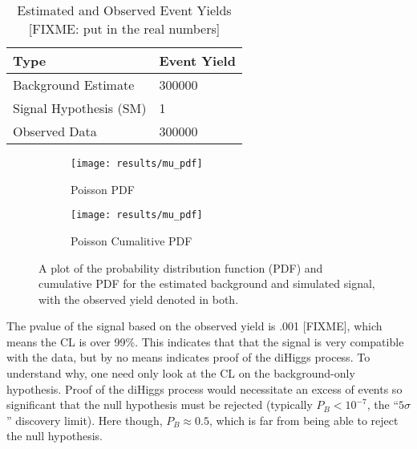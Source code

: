     \begin{table}[tbh]
       \begin{center}
           \caption{Estimated and Observed Event Yields [FIXME: put in the real numbers]}
           \label{tab:event_yield}
           \footnotesize
           \begin{tabular}{|l|l|}
           \toprule
               Type  &	Event Yield \\
               \midrule
               Background Estimate  & 300000 \\
               Signal Hypothesis (SM) & 1 \\
               Observed Data & 300000 \\
           \bottomrule
           \end{tabular}
       \end{center}
    \end{table}

    \begin{figure} %
        \centering
        \begin{subfigure}{0.48\textwidth} 
            \texttt{[image: results/mu\_pdf]}
            \caption{Poisson PDF}
            \label{fig:poisson_sig:pdf}
        \end{subfigure}
        \begin{subfigure}{0.48\textwidth}
            \texttt{[image: results/mu\_pdf]}
            \caption{Poisson Cumalitive PDF}
            \label{fig:poisson_sig:Cpdf}
        \end{subfigure}
        \caption{
            A plot of the probability distribution function (PDF)
                and cumulative PDF for the estimated background and simulated signal,
                with the observed yield denoted in both.
        }
    \end{figure}

    The pvalue of the signal based on the observed yield is .001 [FIXME],
        which means the CL is over 99\%.
    This indicates that that the signal is very compatible with the data,
        but by no means indicates proof of the diHiggs process.
    To understand why, one need only look at the CL on the background-only hypothesis.
    Proof of the diHiggs process would necessitate an excess of events so significant that
        the null hypothesis must be rejected (typically $P_B < 10^{-7}$, the ``$5\sigma$'' discovery limit).
    Here though, $P_B \approx 0.5$, which is far from being able to reject the null hypothesis.

